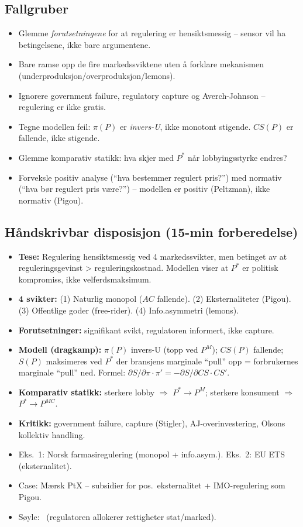 \subsection*{Fallgruber}
\begin{itemize}\setlength{\itemsep}{2pt}
\item Glemme \emph{forutsetningene} for at regulering er hensiktsmessig -- sensor vil ha betingelsene, ikke bare argumentene.
\item Bare ramse opp de fire markedssviktene uten å forklare mekanismen (underproduksjon/overproduksjon/lemons).
\item Ignorere government failure, regulatory capture og Averch-Johnson -- regulering er ikke gratis.
\item Tegne modellen feil: $\pi(P)$ er \emph{invers-U}, ikke monotont stigende. $CS(P)$ er fallende, ikke stigende.
\item Glemme komparativ statikk: hva skjer med $P^*$ når lobbyingsstyrke endres?
\item Forveksle positiv analyse (``hva bestemmer regulert pris?'') med normativ (``hva bør regulert pris være?'') -- modellen er positiv (Peltzman), ikke normativ (Pigou).
\end{itemize}

\FloatBarrier
\subsection*{Håndskrivbar disposisjon (15-min forberedelse)}
\begin{itemize}\setlength{\itemsep}{2pt}
\item \textbf{Tese:} Regulering hensiktsmessig ved 4 markedssvikter, men betinget av at reguleringsgevinst > reguleringskostnad. Modellen viser at $P^*$ er politisk kompromiss, ikke velferdsmaksimum.
\item \textbf{4 svikter:} (1) Naturlig monopol ($AC$ fallende). (2) Eksternaliteter (Pigou). (3) Offentlige goder (free-rider). (4) Info.asymmetri (lemons).
\item \textbf{Forutsetninger:} signifikant svikt, regulatoren informert, ikke capture.
\item \textbf{Modell (dragkamp):} $\pi(P)$ invers-U (topp ved $P^M$); $CS(P)$ fallende; $S(P)$ maksimeres ved $P^*$ der bransjens marginale ``pull'' opp = forbrukernes marginale ``pull'' ned. Formel: $\partial S/\partial\pi \cdot \pi' = -\partial S/\partial CS \cdot CS'$.
\item \textbf{Komparativ statikk:} sterkere lobby $\Rightarrow$ $P^*\to P^M$; sterkere konsument $\Rightarrow$ $P^*\to P^{MC}$.
\item \textbf{Kritikk:} government failure, capture (Stigler), AJ-overinvestering, Olsons kollektiv handling.
\item Eks.\ 1: Norsk farmasiregulering (monopol + info.asym.). Eks.\ 2: EU ETS (eksternalitet).
\item Case: Mærsk PtX -- subsidier for pos.\ eksternalitet + IMO-regulering som Pigou.
\item Søyle: \SOne\ (regulatoren allokerer rettigheter stat/marked).
\end{itemize}
